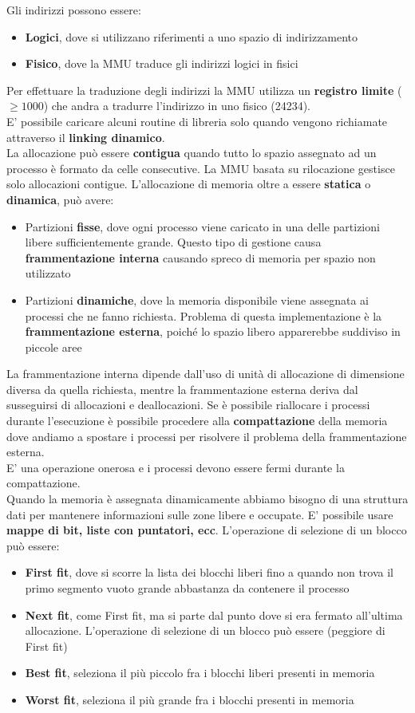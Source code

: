\documentclass{article}
\begin{document}
Gli indirizzi possono essere:
\begin{itemize}
  \item \textbf{Logici}, dove si utilizzano riferimenti a uno spazio di indirizzamento
  \item \textbf{Fisico}, dove la MMU traduce gli indirizzi logici in fisici
\end{itemize}
Per effettuare la traduzione degli indirizzi la MMU utilizza un \textbf{registro limite} ($\geq 1000$) che andra a tradurre l'indirizzo in uno fisico (24234).\\
E' possibile caricare alcuni routine di libreria solo quando vengono richiamate attraverso il \textbf{linking dinamico}.\\
La allocazione può essere \textbf{contigua} quando tutto lo spazio assegnato ad un processo è formato da celle consecutive. La MMU basata su rilocazione gestisce solo allocazioni contigue.
L'allocazione di memoria oltre a essere \textbf{statica} o \textbf{dinamica}, può avere:
\begin{itemize}
  \item Partizioni \textbf{fisse}, dove ogni processo viene caricato in una delle partizioni libere sufficientemente grande. Questo tipo di gestione causa \textbf{frammentazione interna} causando spreco di memoria per spazio non utilizzato 
  \item Partizioni \textbf{dinamiche}, dove la memoria disponibile viene assegnata ai processi che ne fanno richiesta. Problema di questa implementazione è la \textbf{frammentazione esterna}, poiché lo spazio libero apparerebbe suddiviso in piccole aree
\end{itemize}
La frammentazione interna dipende dall'uso di unità di allocazione di dimensione diversa da quella richiesta, mentre la frammentazione esterna deriva dal susseguirsi di allocazioni e deallocazioni. Se è possibile riallocare i processi durante l'esecuzione è possibile procedere alla \textbf{compattazione} della memoria dove andiamo a spostare i processi per risolvere il problema della frammentazione esterna.\\
E' una operazione onerosa e i processi devono essere fermi durante la compattazione.\\
Quando la memoria è assegnata dinamicamente abbiamo bisogno di una struttura dati per mantenere informazioni sulle zone libere e occupate. E' possibile usare \textbf{mappe di bit, liste con puntatori, ecc}. L'operazione di selezione di un blocco può essere:
\begin{itemize}
  \item \textbf{First fit}, dove si scorre la lista dei blocchi liberi fino a quando non trova il primo segmento vuoto grande abbastanza da contenere il processo
  \item \textbf{Next fit}, come First fit, ma si parte dal punto dove si era fermato all'ultima allocazione. L'operazione di selezione di un blocco può essere (peggiore di First fit)
  \item \textbf{Best fit}, seleziona il più piccolo fra i blocchi liberi presenti in memoria
  \item \textbf{Worst fit}, seleziona il più grande fra i blocchi presenti in memoria
\end{itemize}
\end{document}
